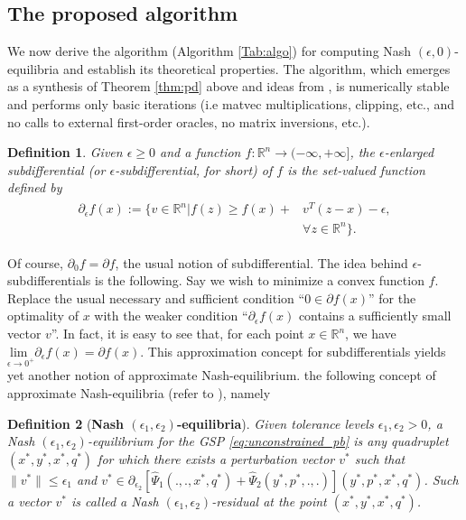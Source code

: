 \documentclass{article}
\newtheorem{definition}{Definition}
\begin{document}
\subsection{The proposed algorithm}
We now derive the algorithm (Algorithm \ref{Tab:algo}) for computing
Nash $(\epsilon, 0)$-equilibria and establish its theoretical
properties. The algorithm, which emerges as a synthesis of Theorem
\ref{thm:pd} above and ideas from \cite{he2013accelerating},  is
numerically stable and performs only basic iterations (i.e matvec
multiplications, clipping, etc., and no calls to external first-order
oracles, no matrix inversions, etc.).
\label{sec:algo}
\begin{definition}
  Given $\epsilon \ge 0$ and a function $f:\mathbb{R}^n
  \rightarrow (-\infty,+\infty]$, the $\epsilon$-enlarged
  subdifferential (or
  $\epsilon$-subdifferential, for short) of $f$ is the set-valued
  function defined by
  \begin{eqnarray}
    \begin{split}
    \partial_\epsilon f(x):= \{v \in \mathbb{R}^n | f(z)
    \ge f(x) + &v^T(z - x) - \epsilon,\\
    &\forall z \in \mathbb{R}^n\}.
    \end{split}
\end{eqnarray}
\end{definition}
Of course, $\partial_0f = \partial f$, the usual notion of
subdifferential. The idea behind $\epsilon$-subdifferentials is the
following. Say we wish to minimize a convex function $f$. Replace the usual
necessary and sufficient condition ``$0 \in \partial f(x)$'' for the
optimality of $x$ with the weaker condition ``$\partial_\epsilon f(x)$
contains a sufficiently small vector $v$''.  In fact, it is easy to
 see that, for each
point $x \in \mathbb{R}^n$, we have $\underset{\epsilon \rightarrow
  0^+}{\text{lim }}\partial_\epsilon f(x) = \partial f(x)$.
This approximation concept for subdifferentials yields yet another notion
of approximate Nash-equilibrium.
the following concept of approximate Nash-equilibria (refer to
\cite{he2013accelerating}), namely

\begin{definition}[\textbf{Nash $(\epsilon_1,\epsilon_2)$-equilibria}]
Given tolerance levels $\epsilon_1, \epsilon_2 > 0$, a Nash
$(\epsilon_1,\epsilon_2)$-equilibrium for the GSP \eqref{eq:unconstrained_pb}
is any quadruplet $(x^*, y^*, x^*, q^*)$ for which
there exists a perturbation vector $v^*$ such that
$\|v^*\| \le \epsilon_1$ and $v^* \in
\partial_{\epsilon_2}[\hat{\Psi}_1(., ., x^*, q^*) +
  \hat{\Psi}_2(y^*, p^*, ., .)](y^*,p^*,x^*,q^*)$.
Such a vector $v^*$ is called a Nash $(\epsilon_1,
\epsilon_2)$-residual at the point $(x^*,
y^*, x^*, q^*)$.
\label{thm:cool_notion}
\end{definition}
\end{document}
